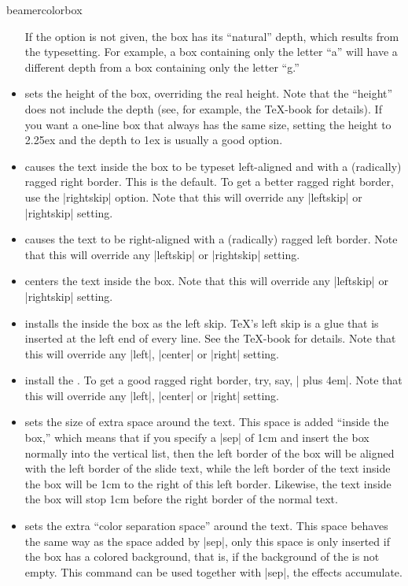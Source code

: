 \begin{environment}{{beamercolorbox}}
\begin{itemize}
    If the option is not given, the box has its ``natural'' depth, which results from the typesetting. For example, a box containing only the letter ``a'' will have a different depth from a box containing only the letter ``g.''
  \item
     sets the height of the box, overriding the real height. Note that the ``height'' does not include the depth (see, for example, the \TeX-book for details). If you want a one-line box that always has the same size, setting the height to 2.25ex and the depth to 1ex is usually a good option.
  \item
     causes the text inside the box to be typeset left-aligned and with a (radically) ragged right border. This is the default. To get a better ragged right border, use the |rightskip| option. Note that this will override any |leftskip| or |rightskip| setting.
  \item
     causes the text to be right-aligned with a (radically) ragged left border. Note that this will override any |leftskip| or |rightskip| setting.
  \item
     centers the text inside the box. Note that this will override any |leftskip| or |rightskip| setting.
  \item
     installs the  inside the box as the left skip. \TeX's left skip is a glue that is inserted at the left end of every line. See the \TeX-book for details. Note that this will override any |left|, |center| or |right| setting.
  \item
     install the . To get a good ragged right border, try, say, |\rightskip=0pt plus 4em|. Note that this will override any |left|, |center| or |right| setting.
  \item
     sets the size of extra space around the text. This space is added ``inside the box,'' which means that if you specify a |sep| of 1cm and insert the box normally into the vertical list, then the left border of the box will be aligned with the left border of the slide text, while the left border of the text inside the box will be 1cm to the right of this left border. Likewise, the text inside the box will stop 1cm before the right border of the normal text.
  \item
     sets the extra ``color separation space'' around the text. This space behaves the same way as the space added by |sep|, only this space is only inserted if the box has a colored background, that is, if the background of the  is not empty. This command can be used together with |sep|, the effects accumulate.

\end{itemize}
\end{environment}
